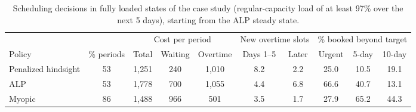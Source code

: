 \begin{table}[!htbp]
\centering
\caption{Scheduling decisions in fully loaded states of the case study (regular-capacity load of at least 97\% over the next 5 days), starting from the ALP steady state.}
\label{tab:steady_state_full_load_decisions}
\small
\begin{tabular}{lccccccccc}
\toprule
& & \multicolumn{3}{c}{Cost per period} & \multicolumn{2}{c}{New overtime slots} & \multicolumn{3}{c}{\% booked beyond target}\\
\cmidrule(lr){3-5}\cmidrule(lr){6-7}\cmidrule(lr){8-10}
Policy & \% periods & Total & Waiting & Overtime & Days 1--5 & Later & Urgent & 5-day & 10-day\\
\midrule
Penalized hindsight & 53 & 1{,}251 & 240 & 1{,}010 & 8.2 & 2.2 & 25.0 & 10.5 & 19.1 \\
ALP & 53 & 1{,}778 & 700 & 1{,}055 & 4.4 & 6.8 & 66.6 & 40.7 & 13.1 \\
Myopic & 86 & 1{,}488 & 966 & 501 & 3.5 & 1.7 & 27.9 & 65.2 & 44.3 \\
\bottomrule
\end{tabular}
\end{table}